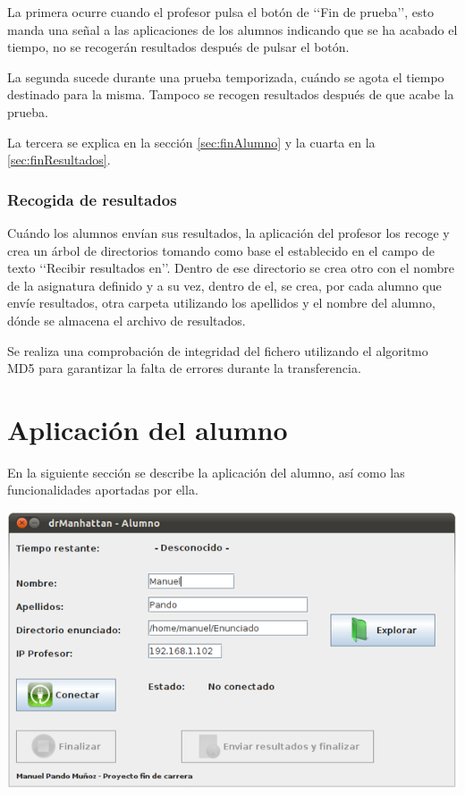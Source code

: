 \documentclass[11pt]{article}
\begin{document}
La primera ocurre cuando el profesor pulsa el botón de \lq\lq Fin de prueba\rq\rq, esto manda una señal a las aplicaciones de los alumnos indicando que se ha acabado el tiempo, no se recogerán resultados después de pulsar el botón.

La segunda sucede durante una prueba temporizada, cuándo se agota el tiempo destinado para la misma. Tampoco se recogen resultados después de que acabe la prueba.

La tercera se explica en la sección \ref{sec:finAlumno} y la cuarta en la \ref{sec:finResultados}.

\subsubsection{Recogida de resultados}

Cuándo los alumnos envían sus resultados, la aplicación del profesor los recoge y crea un árbol de directorios tomando como base el establecido en el campo de texto \lq\lq Recibir resultados en\rq\rq. Dentro de ese directorio se crea otro con el nombre de la asignatura definido y a su vez, dentro de el, se crea, por cada alumno que envíe resultados, otra carpeta utilizando los apellidos y el nombre del alumno, dónde se almacena el archivo de resultados.

Se realiza una comprobación de integridad del fichero utilizando el algoritmo MD5 para garantizar la falta de errores durante la transferencia.

\newpage
\section{Aplicación del alumno}

En la siguiente sección se describe la aplicación del alumno, así como las funcionalidades aportadas por ella.

\begin{center}
    \includegraphics[width=.90\linewidth]{imagenes/GUIAlumno}
\end{center}
\end{document}
